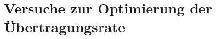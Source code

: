 \chapter{Versuche zur Optimierung der Übertragungsrate}
\label{cha:VersuchezurOptimierungderÜbertragungsrate}